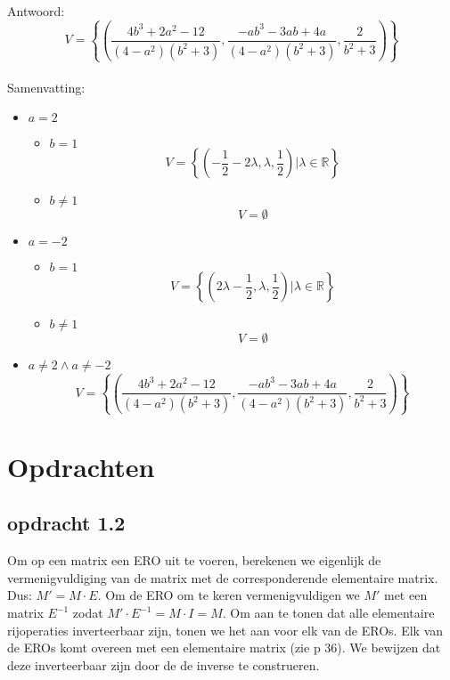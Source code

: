 \documentclass[lineaire_algebra_oplossingen.tex]{subfiles}
\begin{document}
Antwoord:
\[
V = \left\lbrace\left(\frac{4b^{3}+2a^{2}-12}{(4-a^{2})(b^{2}+3)},\frac{-ab^{3}-3ab+4a}{(4-a^{2})(b^{2}+3)},\frac{2}{b^{2}+3}\right)\right\rbrace
\]
\\Samenvatting:
\begin{itemize}
\item $a=2$
\begin{itemize}
\item $b=1$
\[
V = \left\lbrace \left(-\frac{1}{2}-2\lambda,\lambda,\frac{1}{2}\right)| \lambda \in \mathbb{R}\right\rbrace
\]
\item $b\neq 1$
\[
V = \emptyset
\]
\end{itemize}
\item $a=-2$
\begin{itemize}
\item $b=1$
\[
V= \left\lbrace \left(2\lambda-\frac{1}{2},\lambda,\frac{1}{2}\right)| \lambda \in \mathbb{R}\right\rbrace
\]
\item $b\neq 1$
\[
V= \emptyset
\]
\end{itemize}
\item $a\neq 2 \wedge a \neq -2$ 
\[
V = \left\lbrace\left(\frac{4b^{3}+2a^{2}-12}{(4-a^{2})(b^{2}+3)},\frac{-ab^{3}-3ab+4a}{(4-a^{2})(b^{2}+3)},\frac{2}{b^{2}+3}\right)\right\rbrace
\]
\end{itemize}

\section{Opdrachten}
\subsection{opdracht 1.2}
Om op een matrix een ERO uit te voeren, berekenen we eigenlijk de vermenigvuldiging van de matrix met de corresponderende elementaire matrix. Dus: $M' = M \cdot E$. Om de ERO om te keren vermenigvuldigen we $M'$ met een matrix $E^{-1}$ zodat $M'\cdot E^{-1} = M \cdot I = M$.
Om aan te tonen dat alle elementaire rijoperaties inverteerbaar zijn, tonen we het aan voor elk van de EROs. Elk van de EROs komt overeen met een elementaire matrix (zie p 36). We bewijzen dat deze inverteerbaar zijn door de de inverse te construeren.
\end{document}
